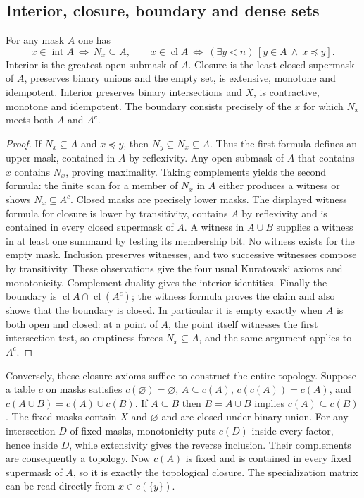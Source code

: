 \subsection{Interior, closure, boundary and dense sets}

\begin{theorem}\label{idx-finite66}
For any mask $A$ one has
\[
 x\in\operatorname{int} A\ \Longleftrightarrow\ N_x\subseteq A,
 \qquad
 x\in\operatorname{cl} A\ \Longleftrightarrow\
    (\exists y<n)\,[y\in A\ \land\ x\preceq y].
\]
Interior is the greatest open submask of $A$. Closure is the least closed
supermask of $A$, preserves binary unions and the empty set, is extensive,
monotone and idempotent. Interior preserves binary intersections and $X$,
is contractive, monotone and idempotent. The boundary consists precisely of
the $x$ for which $N_x$ meets both $A$ and $A^c$.
\end{theorem}
\begin{proof}
If $N_x\subseteq A$ and $x\preceq y$, then $N_y\subseteq N_x\subseteq A$.
Thus the first formula defines an upper mask, contained in $A$ by
reflexivity. Any open submask of $A$ that contains $x$ contains $N_x$,
proving maximality. Taking complements yields the second formula:
the finite scan for a member of $N_x$ in $A$ either produces a witness or
shows $N_x\subseteq A^c$. Closed masks are precisely lower masks.
The displayed witness formula for closure is lower by transitivity,
contains $A$ by reflexivity and is contained in every closed supermask
of $A$. A witness in $A\cup B$ supplies a witness in at
least one summand by testing its membership bit. No witness exists for
the empty mask. Inclusion preserves witnesses, and two successive
witnesses compose by transitivity. These observations give the four usual
Kuratowski axioms and monotonicity. Complement duality gives the interior
identities. Finally the boundary is $\operatorname{cl}A\cap
\operatorname{cl}(A^c)$; the witness formula proves the claim and also shows
that the boundary is closed. In particular it is empty exactly when $A$ is
both open and closed: at a point of $A$, the point itself witnesses the
first intersection test, so emptiness forces $N_x\subseteq A$, and the
same argument applies to $A^c$.
\end{proof}

Conversely, these closure axioms suffice to construct the entire topology.
Suppose a table $c$ on masks satisfies $c(\varnothing)=\varnothing$,
$A\subseteq c(A)$, $c(c(A))=c(A)$, and $c(A\cup B)=c(A)\cup c(B)$.
If $A\subseteq B$ then $B=A\cup B$ implies $c(A)\subseteq c(B)$. The
fixed masks contain $X$ and $\varnothing$ and are closed under binary
union. For any intersection $D$ of fixed masks, monotonicity puts $c(D)$
inside every factor, hence inside $D$, while extensivity gives the reverse
inclusion. Their complements are consequently a topology. Now $c(A)$ is
fixed and is contained in every fixed supermask of $A$, so it is exactly
the topological closure. The specialization matrix can be read directly
from $x\in c(\{y\})$.

